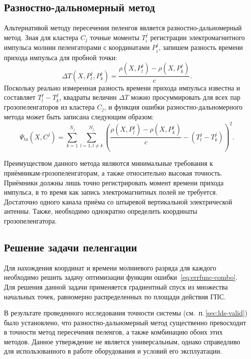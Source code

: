 \subsection{Разностно-дальномерный метод}
Альтернативой методу пересечения пеленгов является разностно-дальномерный метод. Зная для кластера $C_j$ точные моменты $T_i^j$ регистрации электромагнитного импульса молнии пеленгаторами с координатами $P_i^j$, запишем разность времени прихода импульса для пробной точки:
\begin{equation}
	\Delta T(X, P_l^j, P_k^j) = \frac{\rho(X, P_l^j) - \rho(X, P_k^j)}{c}.
\end{equation}
Поскольку реально измеренная разность времени прихода импульса известна и составляет $T_l^j - T_k^j$, квадраты величин $\Delta T$ можно просуммировать для всех пар грозопеленгаторов из кластера $C_j$, и функция ошибки разностно-дальномерного метода может быть записана следующим образом:
\begin{equation}
	\Psi_{ta}(X, C^j) = \sum_{k=1}^{N_j} \sum_{l=1, l \ne k}^{N_j} \left( \frac{\rho(X, P_l^j) - \rho(X, P_k^j)}{c} - (T_l^j - T_k^j)\right)^2.
\end{equation}

Преимуществом данного метода являются минимальные требования к приёмникам-грозопеленгаторам, а также относительно высокая точность. Приёмники должны лишь точно регистрировать момент времени прихода импульса, в то время как запись электромагнитных полей не требуется. Достаточно одного канала приёма со штыревой вертикальной электрической антенны. Также, необходимо однократно определить координаты грозопеленгатора.

\subsection{Решение задачи пеленгации}
Для нахождения координат и времени молниевого разряда для каждого необходимо решить задачу оптимизации функции ошибки~\eqref{eq:errfunc-combo}. Для решения данной задачи применяется градиентный спуск из множества начальных точек, равномерно распределенных по площади действия ГПС.

В результате проведенного исследования точности системы (см.~п.\,\ref{sec:lds-valid}) было установлено, что разностно-дальномерный метод существенно превосходит в точности метод пересечения пеленгов, а также комбинацию обоих этих методов. Данное утверждение не является универсальным, однако справедливо для использованного в работе оборудования и условий его эксплуатации.

